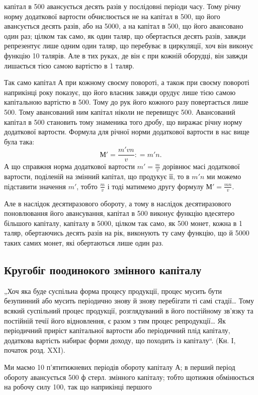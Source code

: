 \parcont{}  %
капітал в 500 авансується десять разів у послідовні періоди часу.
Тому річну норму додаткової вартости обчислюється не на капітал в 500, що його авансується десять разів, або на 5000, а на капітал
в 500, що його авансовано один раз; цілком так само,
як один таляр, що обертається десять разів, завжди репрезентує лише
одним один таляр, що перебуває в циркуляції, хоч він виконує функцію
10 талярів. Але в тих руках, де він є при кожній оборудці, він завжди
лишається тією самою вартістю в 1 таляр.

Так само капітал $А$ при кожному своєму повороті, а також при своєму
повороті наприкінці року показує, що його власник завжди орудує
лише тією самою капітальною вартістю в 500. Тому до рук його
кожного разу повертається лише 500. Тому авансований ним капітал
ніколи не перевищує 500. Авансований капітал в 500
становить тому знаменика того дробу, що виражає річну норму додаткової
вартости. Формула для річної норми додаткової вартости в нас
вище була така:\[
М' = \frac{m'vn}{v}: = m'n\text{.}
\]
А що справжня норма додаткової вартости $m' = \frac{m}{v}$ дорівнює масі додаткової
вартости, поділеній на змінний капітал, що продукує її, то в
$m'n$ ми можемо підставити значення $m'$, тобто $\frac{m}{v}$ і тоді матимемо другу
формулу $М' = \frac{mn}{v}$.

Але в наслідок десятиразового обороту, а тому в наслідок десятиразового
поновлювання його авансування, капітал в 500 виконує
функцію вдесятеро більшого капіталу, капіталу в 5000, цілком так
само, як 500 монет, кожна в 1 таляр, обертаючись десять разів на рік,
виконують ту саму функцію, що й 5000 таких самих монет, які обертаються
лише один раз.

\subsection{Кругобіг поодинокого змінного капіталу}

„Хоч яка буде суспільна форма процесу продукції, процес мусить
бути безупинний або мусить періодично знову й знову перебігати ті самі
стадії\dots{} Тому всякий суспільний процес продукції, розглядуваний в
його постійному зв’язку та постійній течії його відновлення, є разом з
тим процес репродукції\dots{} Як періодичний приріст капітальної вартости
або періодичний плід капіталу, додаткова вартість набирає форми доходу,
що походить із капіталу“. (Кн. І, початок розд. XXI).

Ми маємо 10 п’ятитижневих періодів обороту капіталу $А$; в перший
період обороту авансується 500 ф стерл. змінного капіталу; тобто щотижня
обмінюється на робочу силу 100, так що наприкінці першого
\parbreak{}  %
